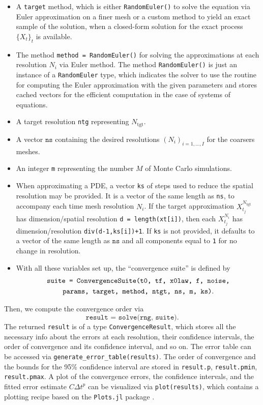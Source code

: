 \documentclass[reqno,12pt]{amsart}
\theoremstyle{plain} %
\theoremstyle{definition} %
\begin{document}
\begin{itemize}
    \item A \texttt{target} method, which is either \texttt{RandomEuler()} to solve the equation via Euler approximation on a finer mesh or a custom method to yield an exact sample of the solution, when a closed-form solution for the exact process $\{X_t\}_t$ is available.
    \item The method \texttt{method = RandomEuler()} for solving the approximations at each resolution $N_i$ via Euler method. The method \texttt{RandomEuler()} is just an instance of a \texttt{RandomEuler} type, which indicates the solver to use the routine for computing the Euler approximation with the given parameters and stores cached vectors for the efficient computation in the case of systems of equations.
    \item A target resolution \texttt{ntg} representing $N_{\textrm{tgt}}.$
    \item A vector $\texttt{ns}$ containing the desired resolutions $(N_i)_{i=1, \ldots, I}$ for the coarsers meshes.
    \item An integer \texttt{m} representing the number $M$ of Monte Carlo simulations.
    \item When approximating a PDE, a vector \texttt{ks} of steps used to reduce the spatial resolution may be provided. It is a vector of the same length as \texttt{ns}, to accompany each time mesh resolution $N_i$. If the target approximation $X_{t_j}^{N_{\textrm{tgt}}}$ has dimension/spatial resolution \texttt{d = length(xt[i])}, then each $X_{t_j}^{N_i}$ has dimension/resolution \texttt{div(d-1,ks[i])+1}. If \texttt{ks} is not provided, it defaults to a vector of the same length as $\texttt{ns}$ and all components equal to \texttt{1} for no change in resolution.
    \item With all these variables set up, the ``convergence suite'' is defined by
    \begin{multline*}
        \texttt{suite = ConvergenceSuite(t0, tf, x0law, f, noise,} \\ 
        \texttt{params, target, \allowbreak method, \allowbreak ntgt, \allowbreak ns, \allowbreak m, ks)}.
    \end{multline*}
\end{itemize}

Then, we compute the convergence order via 
\[ \texttt{result = solve(rng, suite)}.
\]
The returned \texttt{result} is of a type \texttt{ConvergenceResult}, which stores all the necessary info about the errors at each resolution, their confidence intervals, the order of convergence and its confidence interval, and so on. The error table can be accessed via \texttt{generate\_error\_table(results)}. The order of convergence and the bounds for the 95\% confidence interval are stored in \texttt{result.p}, \texttt{result.pmin}, \texttt{result.pmax}. A plot of the convergence errors, the confidence intervals, and the fitted error estimate $C\Delta t^p$ can be visualized via \texttt{plot(results)}, which contains a plotting recipe based on the \texttt{Plots.jl} package \cite{PlotsJL2023}.
\end{document}

